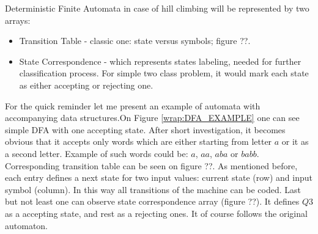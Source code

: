 \documentclass{mini}
\begin{document}
Deterministic Finite Automata in case of hill climbing will be represented by two arrays:
\begin{itemize}
  \item Transition Table - classic one: state versus symbols; figure ??.
  \item State Correspondence - which represents states labeling, needed for further classification process. For simple two class problem, it would mark each state as either accepting or rejecting one. 
\end{itemize}

For the quick reminder let me present an example of automata with accompanying data structures.On Figure \ref{wrap:DFA_EXAMPLE} one can see simple DFA with one accepting state. After short investigation, it becomes obvious that it accepts only words which are either starting from letter $a$ or it as a second letter. Example of such words could be: $a$, $aa$, $aba$ or $babb$. Corresponding transition table can be seen on figure ??. As mentioned before, each entry defines a next state for two input values: current state (row) and input symbol (column). In this way all transitions of the machine can be coded. Last but not least one can observe state correspondence array (figure ??). It defines $Q3$ as a accepting state, and rest as a rejecting ones. It of course follows the original automaton. 
\end{document}

